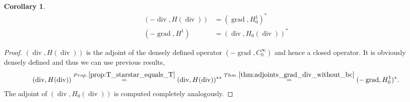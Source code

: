 \documentclass[12pt,a4paper]{article}
\numberwithin{equation}{subsection}
\numberwithin{lemma}{subsection}
\newtheorem{corollary}[lemma]{Corollary}
\theoremstyle{definition}
\DeclareMathOperator{\diver}{div}
\DeclareMathOperator{\grad}{grad}
\DeclareMathOperator{\tr}{tr}
\begin{document}
\begin{corollary}
    \begin{align}
        (-\diver, H(\diver)) &= (\grad, H^1_0)^* \\
        (-\grad, H^1) &= (\diver, H_0(\diver))^*
    \end{align}
\end{corollary}
\begin{proof}
    $(\diver, H(\diver))$ is the adjoint of the densely defined operator 
    $(-\grad, C_0^\infty)$ and hence a closed operator. It is 
    obviously densely defined and thus we can use previous results,
    \begin{align*}
        (\diver, H(\diver)) 
        \stackrel{Prop.\,\ref{prop:T_starstar_equals_T}}{=}(\diver, H(\diver))^{**} 
        \stackrel{Thm.\,\ref{thm:adjoints_grad_div_without_bc}}{=}(-\grad, H^1_0)^*.
    \end{align*}
    The adjoint of $(\diver, H_0(\diver))$ is computed completely analogously.
\end{proof}



\end{document}
